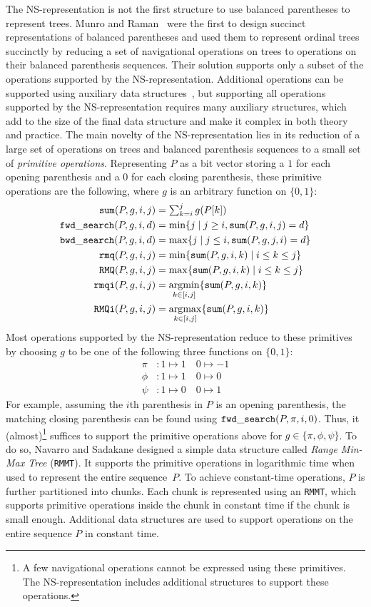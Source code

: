 The NS-representation is not the first structure to use balanced parentheses to
represent trees.
Munro and Raman~\cite{mr1997} were the first to design succinct representations
of balanced parentheses and used them to represent ordinal trees succinctly by
reducing a set of navigational operations on trees to operations on their
balanced parenthesis sequences.
Their solution supports only a subset of the operations supported by the
NS-representation.
Additional operations can be supported using auxiliary data
structures~\cite{ly2008}, but supporting all operations supported by the
NS-representation requires many auxiliary structures, which add to the size
of the final data structure and make it complex in both theory and practice.
The main novelty of the NS-representation lies in its reduction of a large set
of operations on trees and balanced parenthesis sequences to a small set of
\emph{primitive operations}.
Representing $P$ as a bit vector storing a $1$ for each opening parenthesis
and a $0$ for each closing parenthesis, these primitive operations are the
following, where $g$ is an arbitrary function on $\{0,1\}$:
\begin{align*}
\mathtt{sum}(P,g,i,j) &= \textstyle\sum_{k=i}^jg(P[k])\\
\mathtt{fwd\_search}(P,g,i,d) &= \min\{j \mid j \ge i, \mathtt{sum}(P,g,i,j) = d\}\\
\mathtt{bwd\_search}(P,g,i,d) &= \max\{j \mid j \le i, \mathtt{sum}(P,g,j,i) = d\}\\
\mathtt{rmq}(P,g,i,j) &= \min\{\mathtt{sum}(P,g,i,k) \mid i\le k\le j\}\\
\mathtt{RMQ}(P,g,i,j) &= \max\{\mathtt{sum}(P,g,i,k) \mid i\le k\le j\}\\
\mathtt{rmqi}(P,g,i,j) &= \operatorname*{arg\!\min}_{k\in[i,j]}\{\mathtt{sum}(P,g,i,k)\}\\
\mathtt{RMQi}(P,g,i,j) &= \operatorname*{arg\!\max}_{k\in[i,j]}\{\mathtt{sum}(P,g,i,k)\}
\end{align*}
Most operations supported by the NS-representation reduce to these primitives
by choosing $g$ to be one of the following three functions on $\{0,1\}$:
\begin{align*}
  \pi  &: 1 \mapsto 1\quad 0 \mapsto -1\\
  \phi &: 1 \mapsto 1\quad 0 \mapsto 0\\
  \psi &: 1 \mapsto 0\quad 0 \mapsto 1
\end{align*}
For example, assuming the $i$th parenthesis in $P$ is an opening parenthesis,
the matching closing parenthesis can be found using $\mathtt{fwd\_search}(P,\pi,i,0)$.
Thus, it (almost)\footnote{A few navigational operations cannot be expressed
  using these primitives.
  The NS-representation includes additional structures to support these
  operations.}
suffices to support the primitive operations above for
$g \in \{\pi, \phi, \psi\}$.
To do so, Navarro and Sadakane designed a simple data
structure called \emph{Range Min-Max Tree} ({\tt RMMT}).
It supports the primitive operations in logarithmic time when used to represent
the entire sequence~$P$.
To achieve constant-time operations, $P$ is further partitioned into chunks.
Each chunk is represented using an {\tt RMMT}, which supports primitive
operations inside the chunk in constant time if the chunk is small enough.
Additional data structures are used to support operations on the entire sequence
$P$ in constant time.

